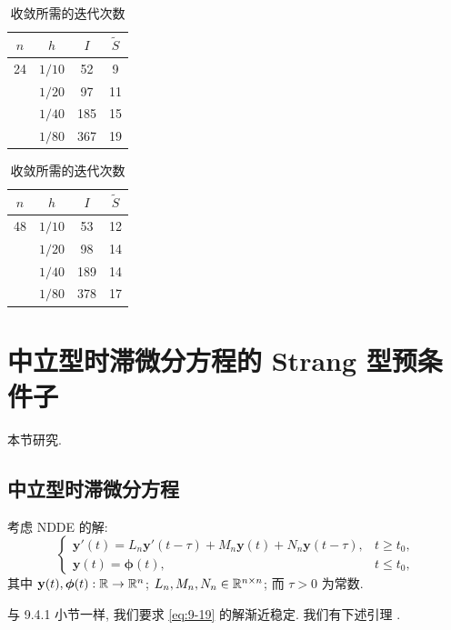 \begin{table}[htbp]
  \centering
  \caption{收敛所需的迭代次数}
  \label{tab:9-2}
  \begin{tabular}{cccc}
    \toprule
    $n$ & $h$ & $I$ & $\widetilde{S}$\\ \midrule
    24 & $1/10$ & 52  & 9\\
       & $1/20$ & 97  & 11\\
       & $1/40$ & 185 & 15\\
       & $1/80$ & 367 & 19\\ \bottomrule
  \end{tabular}
  \hspace{2em}
  \begin{tabular}{cccc}
    \toprule
    $n$ & $h$ & $I$ & $\widetilde{S}$\\ \midrule
    48 & $1/10$ & 53  & 12\\
       & $1/20$ & 98  & 14\\
       & $1/40$ & 189 & 14\\
       & $1/80$ & 378 & 17\\ \bottomrule
  \end{tabular}
\end{table}

\section{中立型时滞微分方程的 Strang 型预条件子}
\label{sec:9-5}

本节研究.

\subsection{中立型时滞微分方程}
\label{sec:9-5-1}

考虑 NDDE 的解:
\begin{equation}
  \left\{
  \begin{array}{ll}
    \mathbf{y}'(t)=L_n\mathbf{y}'(t-\tau)+M_n\mathbf{y}(t)
      +N_n\mathbf{y}(t-\tau), & t\geqslant t_0,\\
    \mathbf{y}(t)=\boldsymbol{\phi}(t), & t\leqslant t_0,
  \end{array}
  \right.
  \label{eq:9-19}
\end{equation}
其中 $\mathbf{y}(t),\boldsymbol{\phi}(t):\mathbb{R}\to\mathbb{R}^n$; $L_n,M_n,N_n\in\mathbb{R}^{n\times n}$; 而 $\tau>0$ 为常数.

与 9.4.1 小节一样, 我们要求 \eqref{eq:9-19} 的解渐近稳定. 我们有下述引理 \cite{src:41,src:54}.

